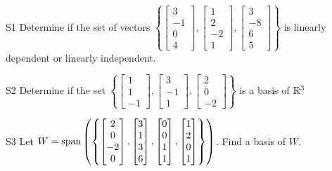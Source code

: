 \documentclass{sbgLAexam}
\begin{document}
\begin{problem}{S1}
Determine if the set of vectors $\left\{\begin{bmatrix} 3 \\ -1 \\ 0 \\ 4 \end{bmatrix}, \begin{bmatrix} 1  \\ 2 \\ -2 \\ 1 \end{bmatrix}, \begin{bmatrix} 3 \\ -8 \\ 6 \\ 5 \end{bmatrix} \right\}$  is linearly dependent or linearly independent.
\end{problem}

\begin{problem}{S2}
Determine if the set $\left\{\begin{bmatrix} 1 \\ 1 \\ -1 \end{bmatrix}, \begin{bmatrix} 3 \\ -1 \\ 1 \end{bmatrix},\begin{bmatrix} 2 \\ 0 \\ -2 \end{bmatrix}\right\}$ is a basis of $\mathbb{R}^3$
\end{problem}
\newpage

\begin{problem}{S3}
Let $W={\rm span}\left(\left\{\begin{bmatrix} 2 \\ 0 \\ -2 \\ 0 \end{bmatrix}, \begin{bmatrix} 3 \\ 1 \\ 3 \\ 6 \end{bmatrix}, \begin{bmatrix} 0 \\ 0 \\ 1 \\ 1 \end{bmatrix}, \begin{bmatrix}1 \\ 2 \\ 0 \\ 1 \end{bmatrix}\right\}\right)$.  Find a basis of $W$.
\end{problem}
\end{document}

